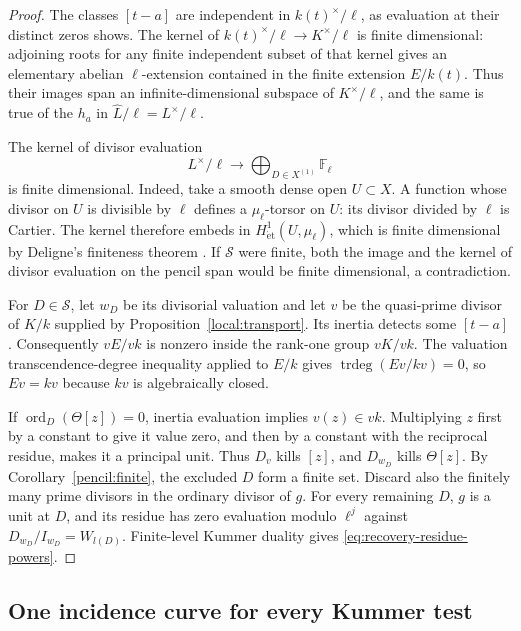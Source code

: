 \begin{proof}
The classes $[t-a]$ are independent in $k(t)^\times/\ell$, as evaluation
at their distinct zeros shows. The kernel of
$k(t)^\times/\ell\to K^\times/\ell$ is finite dimensional: adjoining
roots for any finite independent subset of that kernel gives an
elementary abelian $\ell$-extension contained in the finite extension
$E/k(t)$. Thus their images span an infinite-dimensional subspace of
$K^\times/\ell$, and the same is true of the $h_a$ in
$\widehat L/\ell=L^\times/\ell$.

The kernel of divisor evaluation
\[
 L^\times/\ell\longrightarrow
 \bigoplus_{D\in X^{(1)}}\mathbb F_\ell
\]
is finite dimensional. Indeed, take a smooth dense open $U\subset X$.
A function whose divisor on $U$ is divisible by $\ell$ defines a
$\mu_\ell$-torsor on $U$: its divisor divided by $\ell$ is Cartier.
The kernel therefore embeds in
$H^1_{\mathrm{\acute et}}(U,\mu_\ell)$, which is finite dimensional
by Deligne's finiteness theorem
\cite[Th\'eor\`emes de finitude, Theorem 1.1]{DeligneSGA4half}.
If $\mathcal S$ were finite, both the image and the kernel
of divisor evaluation on the pencil span would be finite dimensional,
a contradiction.

For $D\in\mathcal S$, let $w_D$ be its divisorial valuation and let $v$
be the quasi-prime divisor of $K/k$ supplied by
Proposition~\ref{local:transport}. Its inertia detects some $[t-a]$.
Consequently $vE/vk$ is nonzero inside the rank-one group $vK/vk$.
The valuation transcendence-degree inequality applied to $E/k$ gives
$\operatorname{trdeg}(Ev/kv)=0$, so $Ev=kv$ because $kv$ is
algebraically closed.

If $\operatorname{ord}_D(\Theta[z])=0$, inertia evaluation implies
$v(z)\in vk$. Multiplying $z$ first by a constant to give it value zero,
and then by a constant with the reciprocal residue, makes it a
principal unit. Thus $D_v$ kills $[z]$, and $D_{w_D}$ kills $\Theta[z]$.
By Corollary~\ref{pencil:finite}, the excluded $D$ form a finite set.
Discard also the finitely many prime divisors in the ordinary divisor
of $g$. For every remaining $D$, $g$ is a unit at $D$, and its residue
has zero evaluation modulo $\ell^j$ against
$D_{w_D}/I_{w_D}=W_{l(D)}$. Finite-level Kummer duality gives
\eqref{eq:recovery-residue-powers}.
\end{proof}

\subsection{One incidence curve for every Kummer test}

